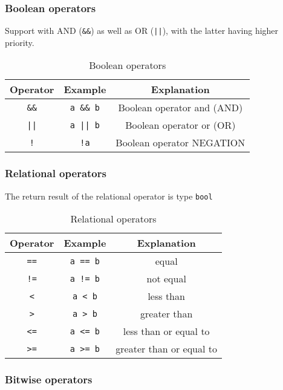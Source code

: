 \subsubsection*{Boolean operators}

Support with AND (\verb|&&|) as well as OR (\verb!||!), with the latter having higher priority.

\begin{table}
\centering
\begin{tabular}{c|c|c}
    Operator & Example & Explanation \\ \hline
    \verb|&&| & \verb|a && b| & Boolean operator and (AND) \\
    \verb!||! & \verb!a || b! & Boolean operator or (OR) \\
    \verb|!| & \verb|!a| & Boolean operator NEGATION \\
\end{tabular}
\caption{Boolean operators}
\end{table}

\subsubsection*{Relational operators}

The return result of the relational operator is type \texttt{bool}

\begin{table}
\centering
\begin{tabular}{c|c|c}
    Operator & Example & Explanation \\ \hline
    \verb|==| & \verb|a == b| & equal \\
    \verb|!=| & \verb|a != b| & not equal \\
    \verb|<| & \verb|a < b| & less than \\
    \verb|>| & \verb|a > b| & greater than \\
    \verb|<=| & \verb|a <= b| & less than or equal to \\
    \verb|>=| & \verb|a >= b| & greater than or equal to \\
\end{tabular}
\caption{Relational operators}
\end{table}

\subsubsection*{Bitwise operators}

